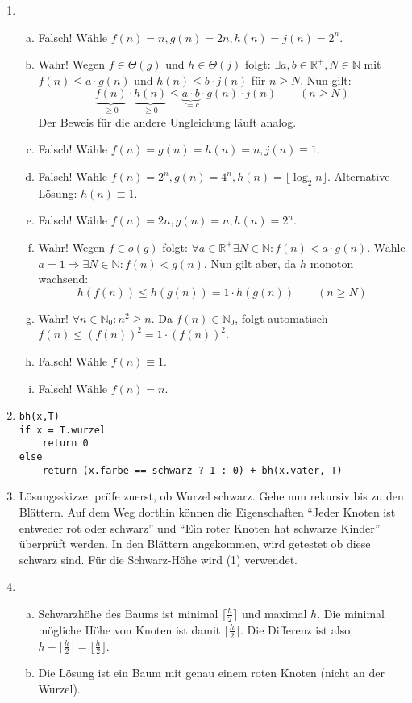 \documentclass{scrartcl}
\begin{document}
\begin{enumerate}[(1)]
\item \begin{enumerate}[(a)]
\item Falsch! W\"ahle $f(n)=n, g(n)=2n, h(n)=j(n)=2^n$.
\item Wahr! Wegen $f\in\Theta(g)$ und $h\in\Theta(j)$ folgt: $\exists a,b\in \mathbb{R}^+, N\in\mathbb{N}$ mit $f(n)\leq a\cdot g(n)$ und $h(n)\leq b\cdot j(n)$ f\"ur $n\geq N$. Nun gilt:
$$\underbrace{f(n)}_{\geq 0}\cdot\underbrace{h(n)}_{\geq 0}\leq \underbrace{a\cdot b}_{:=c}\cdot g(n)\cdot j(n)\qquad (n\geq N)$$
Der Beweis f\"ur die andere Ungleichung l\"auft analog.
\item Falsch! W\"ahle $f(n)=g(n)=h(n)=n, j(n)\equiv 1$.
\item Falsch! W\"ahle $f(n)=2^n, g(n)=4^n, h(n)=\lfloor \log_2 n\rfloor$.\newline
Alternative L\"osung: $h(n)\equiv 1$.
\item Falsch! W\"ahle $f(n)=2n, g(n)=n, h(n)=2^n$.
\item Wahr! Wegen $f\in o(g)$ folgt: $\forall a\in\mathbb{R}^+\exists N\in\mathbb{N}: f(n)<a\cdot g(n)$. W\"ahle $a=1\Rightarrow \exists N\in \mathbb{N}:f(n)<g(n)$. Nun gilt aber, da $h$ monoton wachsend:
$$h(f(n))\leq h(g(n))=1\cdot h(g(n))\qquad (n\geq N)$$
\item Wahr! $\forall n\in \mathbb{N}_0: n^2\geq n$. Da $f(n)\in\mathbb{N}_0$, folgt automatisch $f(n)\leq (f(n))^2=1\cdot (f(n))^2$.
\item Falsch! W\"ahle $f(n)\equiv 1$.
\item Falsch! W\"ahle $f(n)=n$.
\end{enumerate}

\item \begin{verbatim}
bh(x,T)
if x = T.wurzel
    return 0
else
    return (x.farbe == schwarz ? 1 : 0) + bh(x.vater, T)
\end{verbatim}

\item L\"osungsskizze: pr\"ufe zuerst, ob Wurzel schwarz. Gehe nun rekursiv bis zu den Bl\"attern. Auf dem Weg dorthin k\"onnen die Eigenschaften "`Jeder Knoten ist entweder rot oder schwarz"' und "`Ein roter Knoten hat schwarze Kinder"' \"uberpr\"uft werden. In den Bl\"attern angekommen, wird getestet ob diese schwarz sind. F\"ur die Schwarz-H\"ohe wird (1) verwendet.

\item \begin{enumerate}[(a)]
\item Schwarzh\"ohe des Baums ist minimal $\lceil\frac{h}{2}\rceil$ und maximal $h$. Die minimal m\"ogliche H\"ohe von Knoten ist damit $\lceil\frac{h}{2}\rceil$. Die Differenz ist also $h-\lceil\frac{h}{2}\rceil=\lfloor\frac{h}{2}\rfloor$.
\item Die L\"osung ist ein Baum mit genau einem roten Knoten (nicht an der Wurzel).
\end{enumerate}


\end{enumerate}
\end{document}
